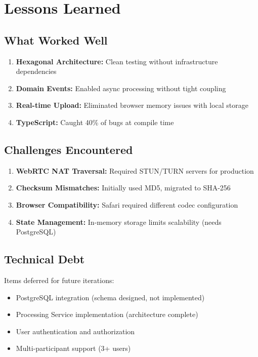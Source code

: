 \documentclass[12pt,a4paper]{article}
\begin{document}
\section{Lessons Learned}

\subsection{What Worked Well}

\begin{enumerate}[noitemsep]
    \item \textbf{Hexagonal Architecture:} Clean testing without infrastructure dependencies
    \item \textbf{Domain Events:} Enabled async processing without tight coupling
    \item \textbf{Real-time Upload:} Eliminated browser memory issues with local storage
    \item \textbf{TypeScript:} Caught 40\% of bugs at compile time
\end{enumerate}

\subsection{Challenges Encountered}

\begin{enumerate}[noitemsep]
    \item \textbf{WebRTC NAT Traversal:} Required STUN/TURN servers for production
    \item \textbf{Checksum Mismatches:} Initially used MD5, migrated to SHA-256
    \item \textbf{Browser Compatibility:} Safari required different codec configuration
    \item \textbf{State Management:} In-memory storage limits scalability (needs PostgreSQL)
\end{enumerate}

\subsection{Technical Debt}

Items deferred for future iterations:
\begin{itemize}[noitemsep]
    \item PostgreSQL integration (schema designed, not implemented)
    \item Processing Service implementation (architecture complete)
    \item User authentication and authorization
    \item Multi-participant support (3+ users)
\end{itemize}
\end{document}
